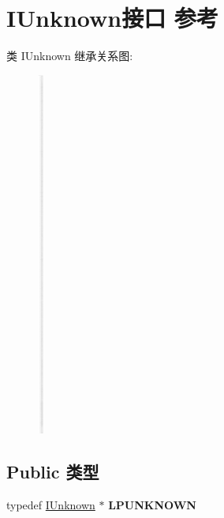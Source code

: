 \hypertarget{interface_i_unknown}{}\section{I\+Unknown接口 参考}
\label{interface_i_unknown}
类 I\+Unknown 继承关系图\+:\begin{figure}[H]
\begin{center}
\leavevmode
\includegraphics[height=12.000000cm]{interface_i_unknown}
\end{center}
\end{figure}
\subsection*{Public 类型}
\begin{DoxyCompactItemize}
\item 
\mbox{\label{interface_i_unknown_ae77732707312c4aca19b0fe4de19eeee}} 
typedef \hyperlink{interface_i_unknown}{I\+Unknown} $\ast$ {\bfseries L\+P\+U\+N\+K\+N\+O\+WN}
\end{DoxyCompactItemize}
